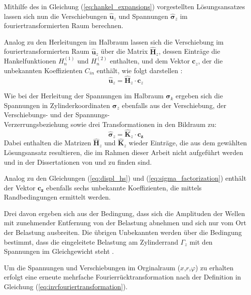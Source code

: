 Mithilfe des in Gleichung (\ref{eq:hankel_expansions}) vorgestellten Lösungsansatzes lassen sich nun die Verschiebungen \(\hat{\mathbf{u}}_{z}\) und Spannungen \(\hat{\boldsymbol{\sigma}}_{z}\) im fouriertransformierten Raum berechnen.

Analog zu den Herleitungen im Halbraum lassen sich die Verschiebung im fouriertransformierten Raum \(\hat{\mathbf{u}}_{z}\) über die Matrix $\hat{\mathbf{H}}_{z}$, dessen Einträge die Hankelfunktionen $H^{(1)}_{n}$ und $H^{(2)}_{n}$ enthalten, und dem Vektor $\mathbf{c}_z$, der die unbekannten Koeffizienten $C_{in}$ enthält, wie folgt darstellen \citep{Fruehe2010}:
\begin{equation}\label{eq:solution_cyl_uz}
	\hat{\mathbf{u}}_{z} = \hat{\mathbf{H}}_{z}\cdot \mathbf{c}_z
\end{equation}

Wie bei der Herleitung der Spannungen im Halbraum $\boldsymbol{\sigma}_{k}$ ergeben sich die Spannungen in Zylinderkoordinaten $\boldsymbol{\sigma}_{z}$ ebenfalls aus der Verschiebung, der Verschiebungs- und der Spannungs-\\Verzerrungsbeziehung sowie drei Transformationen in den Bildraum zu:
\begin{equation}\label{eq:solution_cyl_sig}
	\hat{\boldsymbol{\sigma}}_{z} = \hat{\mathbf{K}}_{z}\cdot \mathbf{c_z}
\end{equation}
Dabei enthalten die Matrizen $\hat{\mathbf{H}}_{z}$ und $\hat{\mathbf{K}}_{z}$ wieder Einträge, die aus dem gewählten Lösungsansatz resultieren, die im Rahmen dieser Arbeit nicht aufgeführt werden und in der Dissertationen von \cite{Fruehe2010} und \cite{Mueller2007} zu finden sind.

Analog zu den Gleichungen (\ref{eq:displ_hs}) und (\ref{eq:sigma_factorization}) enthält der Vektor \(\mathbf{c_z}\) ebenfalls sechs unbekannte Koeffizienten, die mittels Randbedingungen ermittelt werden.

Drei davon ergeben sich aus der Bedingung, dass sich die Amplituden der Wellen mit zunehmender Entfernung von der Belastung abnehmen und sich nur vom Ort der Belastung ausbreiten.
Die übrigen Unbekannten werden über die Bedingung bestimmt, dass die eingeleitete Belastung am Zylinderrand $\Gamma_z$ mit den Spannungen im Gleichgewicht steht \citep{Fruehe2010}.

Um die Spannungen und Verschiebungen im Orginalraum ($x$,$r$,$\varphi$) zu erhalten erfolgt eine erneute mehrfache Fourierrücktransformation nach der Definition in Gleichung (\ref{eq:invfouriertransformation}).





